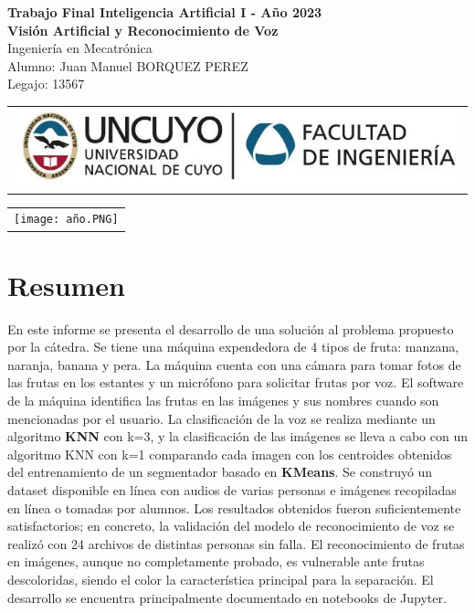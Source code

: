 \documentclass[a4paper, 12pt]{article}
\begin{document}
\begin{titlepage}
    \centering
    \vspace*{5cm}
    {\Large\bfseries Trabajo Final Inteligencia Artificial I - Año 2023}\\
    \vspace{0.2cm}
    {\Large \textbf{Visión Artificial y Reconocimiento de Voz}}\\
    \vspace{0.7cm}
    {\Large Ingeniería en Mecatrónica}\\
    \vspace{1.5cm}
    Alumno: Juan Manuel BORQUEZ PEREZ\\
    Legajo: 13567\\
    \vfill
    {\begin{tabular}{@{}c@{}}\includegraphics[scale=0.4]{escudo.PNG}\end{tabular}}\hspace{10pt}
    {\begin{tabular}{@{}c@{}}\texttt{[image: año.PNG]}\end{tabular}}
\end{titlepage}

\section{Resumen}
En este informe se presenta el desarrollo de una solución al problema propuesto por la cátedra. Se tiene una máquina expendedora de 4 tipos de fruta: manzana, naranja, banana y pera. La máquina cuenta con una cámara para tomar fotos de las frutas en los estantes y un micrófono para solicitar frutas por voz. El software de la máquina identifica las frutas en las imágenes y sus nombres cuando son mencionadas por el usuario. La clasificación de la voz se realiza mediante un algoritmo \textbf{KNN} con k=3, y la clasificación de las imágenes se lleva a cabo con un algoritmo KNN con k=1 comparando cada imagen con los centroides obtenidos del entrenamiento de un segmentador basado en \textbf{KMeans}. Se construyó un dataset disponible en línea con audios de varias personas e imágenes recopiladas en línea o tomadas por alumnos. Los resultados obtenidos fueron suficientemente satisfactorios; en concreto, la validación del modelo de reconocimiento de voz se realizó con 24 archivos de distintas personas sin falla. El reconocimiento de frutas en imágenes, aunque no completamente probado, es vulnerable ante frutas descoloridas, siendo el color la característica principal para la separación. El desarrollo se encuentra principalmente documentado en notebooks de Jupyter.
\vspace{0.5cm}
\end{document}
